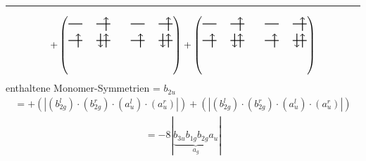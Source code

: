 \documentclass{article}
\begin{document}
\hrule\newpage 
\[ +\left(\text{\begin{tikzpicture}
    \draw[thick] (0,0) -- (0.5,0); %
    \draw[thick] (1,0) -- (1.5,0); %
    \draw[thick] (0,-0.6) -- (0.5,-0.6); %
    \draw[thick] (1,-0.6) -- (1.5,-0.6); %
\draw[->, thick] (1.35, -0.25) -- (1.35, 0.25); 
\draw[-> , thick] (0.35, -0.85) -- (0.35, -0.35); 
 \draw[-> , thick] (1.35, -0.85) -- (1.35, -0.35); 
\draw[<- , thick] (1.15, -0.85) -- (1.15, -0.35); 
\end{tikzpicture}\qquad \begin{tikzpicture}
    \draw[thick] (0,0) -- (0.5,0); %
    \draw[thick] (1,0) -- (1.5,0); %
    \draw[thick] (0,-0.6) -- (0.5,-0.6); %
    \draw[thick] (1,-0.6) -- (1.5,-0.6); %
\draw[->, thick] (1.35, -0.25) -- (1.35, 0.25); 
\draw[-> , thick] (0.35, -0.85) -- (0.35, -0.35); 
 \draw[-> , thick] (1.35, -0.85) -- (1.35, -0.35); 
\draw[<- , thick] (1.15, -0.85) -- (1.15, -0.35); 
\end{tikzpicture}}\right)+\left(\text{\begin{tikzpicture}
    \draw[thick] (0,0) -- (0.5,0); %
    \draw[thick] (1,0) -- (1.5,0); %
    \draw[thick] (0,-0.6) -- (0.5,-0.6); %
    \draw[thick] (1,-0.6) -- (1.5,-0.6); %
\draw[->, thick] (1.35, -0.25) -- (1.35, 0.25); 
\draw[-> , thick] (0.35, -0.85) -- (0.35, -0.35); 
 \draw[-> , thick] (1.35, -0.85) -- (1.35, -0.35); 
\draw[<- , thick] (1.15, -0.85) -- (1.15, -0.35); 
\end{tikzpicture}\qquad \begin{tikzpicture}
    \draw[thick] (0,0) -- (0.5,0); %
    \draw[thick] (1,0) -- (1.5,0); %
    \draw[thick] (0,-0.6) -- (0.5,-0.6); %
    \draw[thick] (1,-0.6) -- (1.5,-0.6); %
\draw[->, thick] (1.35, -0.25) -- (1.35, 0.25); 
\draw[-> , thick] (0.35, -0.85) -- (0.35, -0.35); 
 \draw[-> , thick] (1.35, -0.85) -- (1.35, -0.35); 
\draw[<- , thick] (1.15, -0.85) -- (1.15, -0.35); 
\end{tikzpicture}}\right)\]enthaltene Monomer-Symmetrien = $b_{2u}$\begin{multline*}=+\left(\left|(b_{2g}^{l}) \cdot (b_{2g}^{r}) \cdot (a_{u}^{l}) \cdot (a_{u}^{r})\right|\right)+\left(\left|(b_{2g}^{l}) \cdot (b_{2g}^{r}) \cdot (a_{u}^{l}) \cdot (a_{u}^{r})\right|\right)\end{multline*}
\begin{multline*}
=-8\left|\underbrace{b_{3u} b_{1g} b_{2g} a_{u}}_{a_{g}}\right|
\end{multline*}
\\\\
\end{document}
